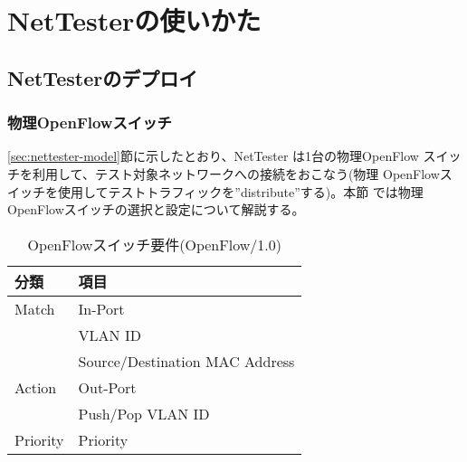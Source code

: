 
\chapter{NetTesterの使いかた}
\label{chap:nettester-usage}

 \section{NetTesterのデプロイ}
 \label{sec:nettester-deployment}

  \subsection{物理OpenFlowスイッチ}
  \label{sec:nettester-deploy-psw}


\ref{sec:nettester-model}節に示したとおり、NetTester は1台の物理OpenFlow
スイッチを利用して、テスト対象ネットワークへの接続をおこなう(物理
OpenFlowスイッチを使用してテストトラフィックを''distribute''する)。本節
では物理OpenFlowスイッチの選択と設定について解説する。


\begin{table}[h]
 \centering
 \caption{OpenFlowスイッチ要件(OpenFlow/1.0)}
 \label{tab:ofs-requirement}
 \begin{tabular}{l|l}
  \hline
  分類 & 項目 \\
  \hline
  \hline
  Match  & In-Port \\ \cline{2-2}
         & VLAN ID \\ \cline{2-2}
         & Source/Destination MAC Address \\ \hline
  Action & Out-Port \\ \cline{2-2}
         & Push/Pop VLAN ID \\ \hline
  Priority & Priority \\
  \hline
 \end{tabular}
\end{table}

